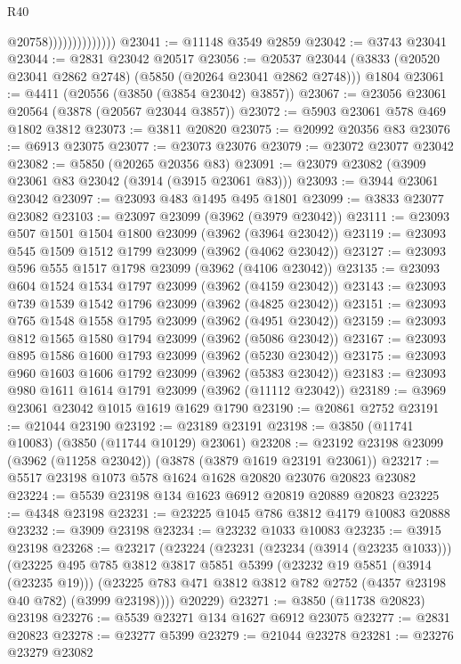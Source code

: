 \begin{lexlean}{R40}
\begin{coremodule}
                                @20758))))))))))))))
@23041 := @11148 @3549 @2859
@23042 := @3743 @23041
@23044 := @2831 @23042 @20517
@23056 := @20537
    @23044
    (@3833 (@20520 @23041 @2862 @2748) (@5850 (@20264 @23041 @2862 @2748)))
    @1804
@23061 := @4411 (@20556 (@3850 (@3854 @23042) @3857))
@23067 := @23056 @23061 @20564 (@3878 (@20567 @23044 @3857))
@23072 := @5903 @23061 @578 @469 @1802 @3812
@23073 := @3811 @20820
@23075 := @20992 @20356 @83
@23076 := @6913 @23075
@23077 := @23073 @23076
@23079 := @23072 @23077 @23042
@23082 := @5850 (@20265 @20356 @83)
@23091 := @23079 @23082 (@3909 @23061 @83 @23042 (@3914 (@3915 @23061 @83)))
@23093 := @3944 @23061 @23042
@23097 := @23093 @483 @1495 @495 @1801
@23099 := @3833 @23077 @23082
@23103 := @23097 @23099 (@3962 (@3979 @23042))
@23111 := @23093 @507 @1501 @1504 @1800 @23099 (@3962 (@3964 @23042))
@23119 := @23093 @545 @1509 @1512 @1799 @23099 (@3962 (@4062 @23042))
@23127 := @23093 @596 @555 @1517 @1798 @23099 (@3962 (@4106 @23042))
@23135 := @23093 @604 @1524 @1534 @1797 @23099 (@3962 (@4159 @23042))
@23143 := @23093 @739 @1539 @1542 @1796 @23099 (@3962 (@4825 @23042))
@23151 := @23093 @765 @1548 @1558 @1795 @23099 (@3962 (@4951 @23042))
@23159 := @23093 @812 @1565 @1580 @1794 @23099 (@3962 (@5086 @23042))
@23167 := @23093 @895 @1586 @1600 @1793 @23099 (@3962 (@5230 @23042))
@23175 := @23093 @960 @1603 @1606 @1792 @23099 (@3962 (@5383 @23042))
@23183 := @23093 @980 @1611 @1614 @1791 @23099 (@3962 (@11112 @23042))
@23189 := @3969 @23061 @23042 @1015 @1619 @1629 @1790
@23190 := @20861 @2752
@23191 := @21044 @23190
@23192 := @23189 @23191
@23198 := @3850 (@11741 @10083) (@3850 (@11744 @10129) @23061)
@23208 := @23192 @23198 @23099 (@3962 (@11258 @23042)) (@3878 (@3879 @1619 @23191 @23061))
@23217 := @5517 @23198 @1073 @578 @1624 @1628 @20820 @23076 @20823 @23082
@23224 := @5539 @23198 @134 @1623 @6912 @20819 @20889 @20823
@23225 := @4348 @23198
@23231 := @23225 @1045 @786 @3812 @4179 @10083 @20888
@23232 := @3909 @23198
@23234 := @23232 @1033 @10083
@23235 := @3915 @23198
@23268 := @23217
    (@23224
      (@23231
        (@23234 (@3914 (@23235 @1033)))
        (@23225
          @495
          @785
          @3812
          @3817
          @5851
          @5399
          (@23232 @19 @5851 (@3914 (@23235 @19)))
          (@23225 @783 @471 @3812 @3812 @782 @2752 (@4357 @23198 @40 @782) (@3999 @23198))))
      @20229)
@23271 := @3850 (@11738 @20823) @23198
@23276 := @5539 @23271 @134 @1627 @6912 @23075
@23277 := @2831 @20823
@23278 := @23277 @5399
@23279 := @21044 @23278
@23281 := @23276 @23279 @23082

\end{coremodule}
\end{lexlean}
